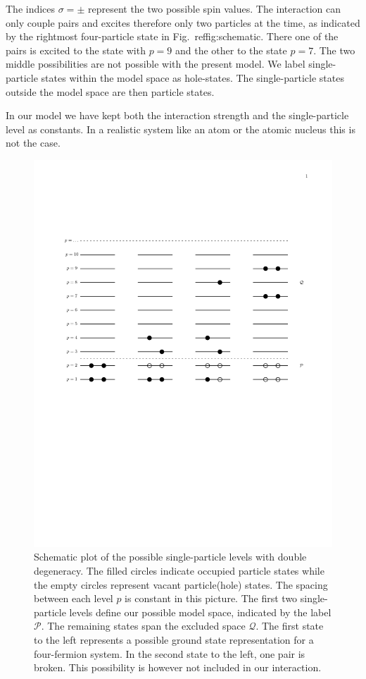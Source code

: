 \documentclass[%
twoside,                 %
final,                   %
10pt]{article}
\begin{document}
The indices
$\sigma=\pm$ represent the two possible spin values. The interaction
can only couple pairs and excites therefore only two particles at the
time, as indicated by the rightmost four-particle state in
Fig.~ref{fig:schematic}. There one of the pairs is excited to the
state with $p=9$ and the other to the state $p=7$. The two middle
possibilities are not possible with the present model.  We label
single-particle states within the model space as hole-states. The
single-particle states outside the model space are then particle
states. 

In our model we have kept both the interaction strength and the
single-particle level as constants.  In a realistic system like an
atom or the atomic nucleus this is not the case.


\begin{figure}[t]
  \centerline{\includegraphics[width=0.7\linewidth]{fig-proj/simplemodel.pdf}}
  \caption{
  Schematic plot of the possible single-particle levels with double degeneracy.  The filled circles indicate occupied particle  states while the empty circles represent vacant particle(hole)  states.  The spacing between each level $p$ is constant in this picture.  The first two single-particle levels define our possible  model space, indicated by the label $\mathcal{P}$.  The remaining  states span the excluded space $\mathcal{Q}$.  The first state to  the left represents a possible ground state representation for a  four-fermion system. In the second state to the left, one pair is   broken. This possibility is however not included in our  interaction. \label{fig:schematic}
  }
\end{figure}
\end{document}
